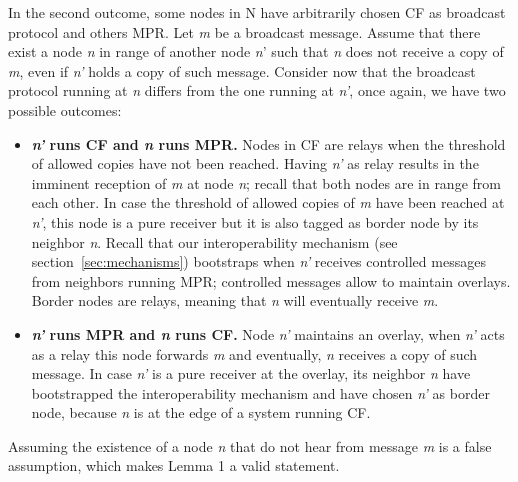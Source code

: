 In the second outcome, some nodes in N have arbitrarily chosen CF as broadcast protocol and others MPR.
Let \emph{m} be a broadcast message.
Assume that there exist a node \emph{n} in range of another node \emph{n}' such that \emph{n} does not receive a copy of \emph{m}, even if \emph{n'} holds a copy of such message.
Consider now that the broadcast protocol running at \emph{n} differs from the one running at \emph{n'}, once again, we have two possible outcomes:

\begin{itemize}
	\item \textbf{\emph{n'} runs CF and \emph{n} runs MPR.} Nodes in CF are relays when the threshold of allowed copies have not been reached. Having \emph{n'} as relay results in the imminent reception of \emph{m} at node \emph{n}; recall that both nodes are in range from each other. In case the threshold of allowed copies of \emph{m} have been reached at \emph{n'}, this node is a pure receiver but it is also tagged as border node by its neighbor \emph{n}. Recall that our interoperability mechanism (see section~\ref{sec:mechanisms}) bootstraps when \emph{n'} receives controlled messages from neighbors running MPR; controlled messages allow to maintain overlays. Border nodes are relays, meaning that \emph{n} will eventually receive \emph{m}.
	\item \textbf{\emph{n'} runs MPR and \emph{n} runs CF.} Node \emph{n'} maintains an overlay, when \emph{n'} acts as a relay this node forwards \emph{m} and eventually, \emph{n} receives a copy of such message. In case \emph{n'} is a pure receiver at the overlay, its neighbor \emph{n} have bootstrapped the interoperability mechanism and have chosen \emph{n'} as border node, because \emph{n} is at the edge of a system running CF.
\end{itemize}

Assuming the existence of a node \emph{n} that do not hear from message \emph{m} is a false assumption, which makes Lemma 1 a valid statement.



